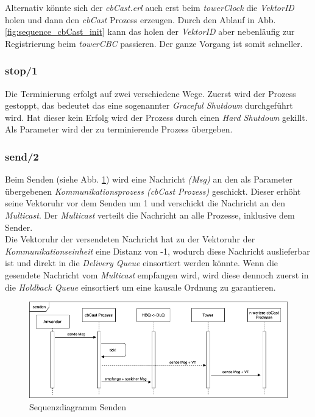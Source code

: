Alternativ könnte sich der \textit{cbCast.erl} auch erst beim \textit{towerClock} die \textit{VektorID} holen und dann den \textit{cbCast} Prozess erzeugen. Durch den Ablauf in Abb. \ref{fig:sequence_cbCast_init} kann das holen der \textit{VektorID} aber nebenläufig zur Registrierung beim \textit{towerCBC} passieren. Der ganze Vorgang ist somit schneller.

\subsubsection{stop/1}

Die Terminierung erfolgt auf zwei verschiedene Wege. Zuerst wird der Prozess gestoppt, das bedeutet das eine sogenannter \textit{Graceful Shutdown} durchgeführt wird. Hat dieser kein Erfolg wird der Prozess durch einen \textit{Hard Shutdown} gekillt.\\
Als Parameter wird der zu terminierende Prozess übergeben.

\subsubsection{send/2}

Beim Senden (siehe Abb. \ref{fig:sequence_cbCast_send}) wird eine Nachricht \textit{(Msg)} an den als Parameter übergebenen \textit{Kommunikationsprozess (cbCast Prozess)} geschickt. Dieser erhöht seine Vektoruhr vor dem Senden um 1 und verschickt die Nachricht an den \textit{Multicast}. Der \textit{Multicast} verteilt die Nachricht an alle Prozesse, inklusive dem Sender.\\
Die Vektoruhr der versendeten Nachricht hat zu der Vektoruhr der \textit{Kommunikationseinheit} eine Distanz von -1, wodurch diese Nachricht auslieferbar ist und direkt in die \textit{Delivery Queue} einsortiert werden könnte.
Wenn die gesendete Nachricht vom \textit{Multicast} empfangen wird, wird diese dennoch zuerst in die \textit{Holdback Queue} einsortiert um eine kausale Ordnung zu garantieren.

\begin{figure}[htbp]
\begin{center}
\includegraphics[scale=0.5]{Latex/Bilder/Sequenz_senden.png}
\caption{\label{fig:sequence_cbCast_send} Sequenzdiagramm Senden}
\end{center}
\end{figure}

